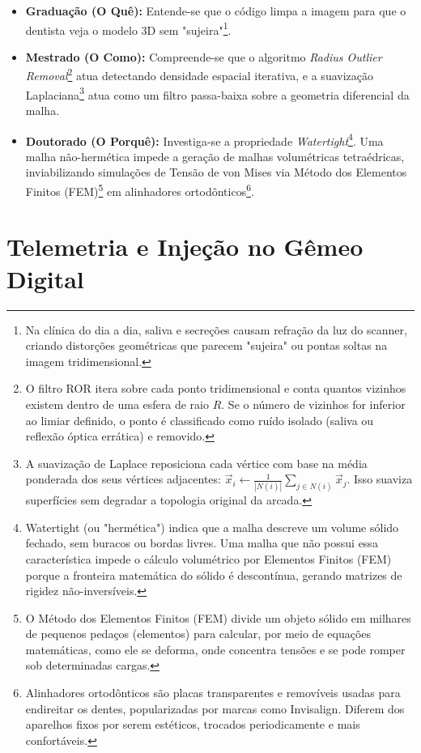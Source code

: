 \begin{itemize}
    \item \textbf{Graduação (O Quê):} Entende-se que o código limpa a imagem para que o dentista veja o modelo 3D sem "sujeira"\footnote{Na clínica do dia a dia, saliva e secreções causam refração da luz do scanner, criando distorções geométricas que parecem "sujeira" ou pontas soltas na imagem tridimensional.}.
    \item \textbf{Mestrado (O Como):} Compreende-se que o algoritmo \textit{Radius Outlier Removal}\footnote{O filtro ROR itera sobre cada ponto tridimensional e conta quantos vizinhos existem dentro de uma esfera de raio $R$. Se o número de vizinhos for inferior ao limiar definido, o ponto é classificado como ruído isolado (saliva ou reflexão óptica errática) e removido.} atua detectando densidade espacial iterativa, e a suavização Laplaciana\footnote{A suavização de Laplace reposiciona cada vértice com base na média ponderada dos seus vértices adjacentes: $\vec{x}_i \leftarrow \frac{1}{|N(i)|} \sum_{j \in N(i)} \vec{x}_j$. Isso suaviza superfícies sem degradar a topologia original da arcada.} atua como um filtro passa-baixa sobre a geometria diferencial da malha.
    \item \textbf{Doutorado (O Porquê):} Investiga-se a propriedade \textit{Watertight}\footnote{Watertight (ou "hermética") indica que a malha descreve um volume sólido fechado, sem buracos ou bordas livres. Uma malha que não possui essa característica impede o cálculo volumétrico por Elementos Finitos (FEM) porque a fronteira matemática do sólido é descontínua, gerando matrizes de rigidez não-inversíveis.}. Uma malha não-hermética impede a geração de malhas volumétricas tetraédricas, inviabilizando simulações de Tensão de von Mises via Método dos Elementos Finitos (FEM)\footnote{O Método dos Elementos Finitos (FEM) divide um objeto sólido em milhares de pequenos pedaços (elementos) para calcular, por meio de equações matemáticas, como ele se deforma, onde concentra tensões e se pode romper sob determinadas cargas.} em alinhadores ortodônticos\footnote{Alinhadores ortodônticos são placas transparentes e removíveis usadas para endireitar os dentes, popularizadas por marcas como Invisalign. Diferem dos aparelhos fixos por serem estéticos, trocados periodicamente e mais confortáveis.}.
\end{itemize}

\section{Telemetria e Injeção no Gêmeo Digital}

